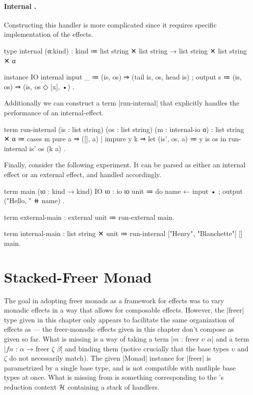 \paragraph{Internal \IO.}
%
Constructing this handler is more complicated since it requires specific implementation of the effects.
\begin{program}
%
type internal (α:kind) : kind
  ≔ list string ✕ list string → list string ✕ list string ✕ α

instance IO internal
  { input  _ ≔ (is, os) ⇒ (tail is, os, head is)
  ; output s ≔ (is, os) ⇒ (is, os ◇ [x], •) }.
\end{program}
%
Additionally we can construct a term \code|run-internal| that explicitly handles the performance of an internal-\IO effect.
%
\begin{program}
term run-internal (is : list string) (os : list string)
        (m : internal-io α)
  : list string ✕ α
  ≔ cases m
      { pure   a   ⇒ ([], a)
      | impure y k ⇒ let (is', os, a) ≔ y is os in
                     run-internal is' os (k a) }.
\end{program}

\newpage
Finally, consider the following experiment.
It can be parsed as either an internal \IO effect or an external \IO effect, and handled accordingly.
%
\begin{snippet}
term main (ιο : kind → kind) {IO ιο} : io ιο unit
  ≔ do
      { name ← input •
      ; output ("Hello, " ⧺ name) }.

term external-main : external unit ≔ run-external main.

term internal-main : list string ✕ unit
  ≔ run-internal ["Henry", "Blanchette"] [] main.
\end{snippet}

\section{Stacked-Freer Monad}

The goal in adopting freer monads as a framework for effects was to vary monadic effects in a way that allows for composable effects.
However, the \code|freer| type given in this chapter only appears to facilitate the same organization of effects as \LangC --- the freer-monadic effects given in this chapter don't compose as given so far.
What is missing is a way of taking a term \code|$m$ : freer $υ$ $α$| and a term \code|$fn$ : $α$ → freer $ζ$ $β$| and binding them (notice crucially that the base types $υ$ and $ζ$ do not necessarily match).
The given \code|Monad| instance for \code|freer| is parametrized by a single base type, and is not compatible with mutliple base types at once.
What is missing from \LangE is something corresponding to the \LangD's reduction context $\mathcal{H}$ containing a stack of handlers.

